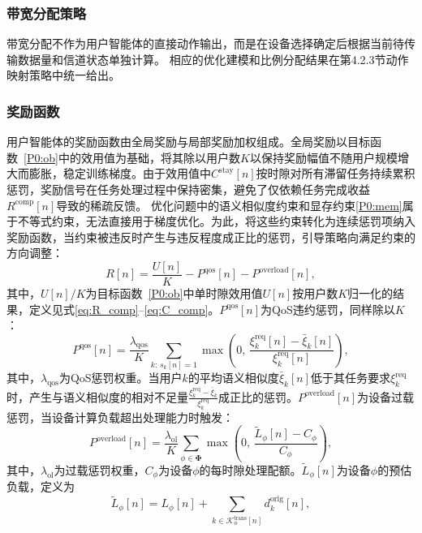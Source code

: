 \subsubsection{带宽分配策略}
带宽分配不作为用户智能体的直接动作输出，而是在设备选择确定后根据当前待传输数据量和信道状态单独计算。
相应的优化建模和比例分配结果在第4.2.3节动作映射策略中统一给出。

\subsubsection{奖励函数}

用户智能体的奖励函数由全局奖励与局部奖励加权组成。全局奖励以目标函数~\eqref{P0:ob}中的效用值为基础，将其除以用户数$K$以保持奖励幅值不随用户规模增大而膨胀，稳定训练梯度。由于效用值中$C^{\text{stay}}[n]$按时隙对所有滞留任务持续累积惩罚，奖励信号在任务处理过程中保持密集，避免了仅依赖任务完成收益$R^{\text{comp}}[n]$导致的稀疏反馈。
优化问题中的语义相似度约束和显存约束\eqref{P0:mem}属于不等式约束，无法直接用于梯度优化。为此，将这些约束转化为连续惩罚项纳入奖励函数，当约束被违反时产生与违反程度成正比的惩罚，引导策略向满足约束的方向调整：
\begin{equation}
R[n] = \frac{U[n]}{K} - P^{\text{qos}}[n] - P^{\text{overload}}[n],
\end{equation}
其中，$U[n]/K$为目标函数~\eqref{P0:ob}中单时隙效用值$U[n]$按用户数$K$归一化的结果，定义见式\eqref{eq:R_comp}--\eqref{eq:C_comp}。$P^{\text{qos}}[n]$为QoS违约惩罚，同样除以$K$：
\begin{equation}
P^{\text{qos}}[n] = \frac{\lambda_{\text{qos}}}{K}\sum_{k:\, s_k[n]=1}\max\!\left(0,\,\frac{\xi_k^{\text{req}}[n] - \bar{\xi}_k[n]}{\xi_k^{\text{req}}[n]}\right),
\end{equation}
其中，$\lambda_{\text{qos}}$为QoS惩罚权重。当用户$k$的平均语义相似度$\bar{\xi}_k[n]$低于其任务要求$\xi_k^{\text{req}}$时，产生与语义相似度的相对不足量$\frac{\xi_k^{\text{req}} - \bar{\xi}_k}{\xi_k^{\text{req}}}$成正比的惩罚。$P^{\text{overload}}[n]$为设备过载惩罚，当设备计算负载超出处理能力时触发：
\begin{equation}
P^{\text{overload}}[n] = \frac{\lambda_{\text{ol}}}{K}\sum_{\phi\in\boldsymbol{\Phi}}\max\!\left(0,\,\frac{\tilde{L}_\phi[n] - C_\phi}{C_\phi}\right),
\end{equation}
其中，$\lambda_{\text{ol}}$为过载惩罚权重，$C_\phi$为设备$\phi$的每时隙处理配额。$\tilde{L}_\phi[n]$为设备$\phi$的预估负载，定义为
\begin{equation}\label{eq:tilde_L}
\tilde{L}_\phi[n] = L_\phi[n] + \sum_{k \in \mathcal{K}_\phi^{\text{trans}}[n]} d_k^{\text{orig}}[n],
\end{equation}
